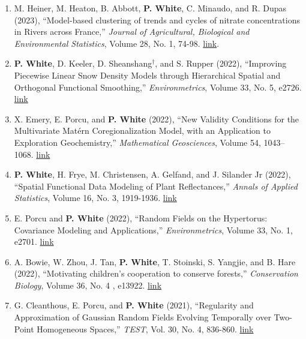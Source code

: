 \documentclass[11pt]{article}
\begin{document}
\begin{enumerate}[label=$\bullet$]
\item M. Heiner, M. Heaton, B. Abbott, \textbf{P. White}, C. Minaudo, and R. Dupas (2023), ``Model-based clustering of trends and cycles of nitrate concentrations in Rivers across France,'' \emph{Journal of Agricultural, Biological and Environmental Statistics}, Volume 28, No. 1, 74-98. \href{https://doi.org/10.1007/s13253-022-00513-2}{link}.


\item \textbf{P. White}, D. Keeler, D. Sheanshang$^\dagger$, and S. Rupper (2022), ``Improving Piecewise Linear Snow Density Models through Hierarchical Spatial and Orthogonal Functional Smoothing,'' \emph{Environmetrics}, Volume 33, No. 5, e2726. \href{http://doi.org/10.1002/env.2726}{link}

\item X. Emery, E. Porcu, and \textbf{P. White} (2022), ``New Validity Conditions for the Multivariate Mat\'ern Coregionalization Model, with an Application to Exploration Geochemistry,'' \emph{Mathematical Geosciences}, Volume 54, 1043–1068. \href{https://link.springer.com/article/10.1007/s11004-022-10000-6}{link} 



\item \textbf{P. White}, H. Frye, M. Christensen, A. Gelfand, and J. Silander Jr (2022), ``Spatial Functional Data Modeling of Plant Reflectances,'' \emph{Annals of Applied Statistics}, Volume 16, No. 3, 1919-1936. \href{http://dx.doi.org/10.1214/21-AOAS1576}{link}


\item  E. Porcu and \textbf{P. White} (2022), ``Random Fields on the Hypertorus: Covariance Modeling and Applications,'' \emph{Environmetrics}, Volume 33, No. 1, e2701. \href{https://doi.org/10.1002/env.2701}{link}


 \item A. Bowie, W. Zhou,  J. Tan, \textbf{P. White}, T. Stoinski, S. Yangjie, and B. Hare (2022), ``Motivating children's cooperation to conserve forests,'' \emph{Conservation Biology}, Volume 36, No. 4 , e13922. \href{https://conbio.onlinelibrary.wiley.com/doi/10.1111/cobi.13922}{link}
 
 


\item G. Cleanthous, E. Porcu, and \textbf{P. White} (2021), ``Regularity and Approximation of Gaussian Random Fields Evolving Temporally over Two-Point Homogeneous Spaces,'' \textit{TEST}, Vol. 30, No. 4, 836-860.  \href{https://link.springer.com/article/10.1007/s11749-021-00755-1}{link}



\end{enumerate}
\end{document}
